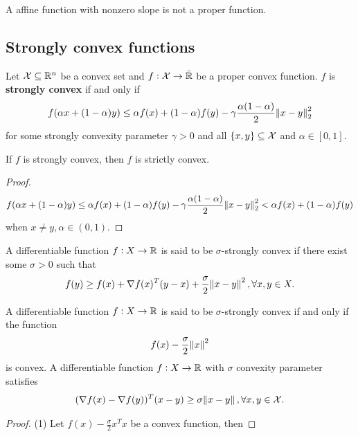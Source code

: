 \begin{refsection}
\begin{remark}
A affine function with nonzero slope is not a proper function.
\end{remark}

\subsection{Strongly convex functions}\label{ch:convex-analysis:sec:stronglyConvexFunctions}
\begin{definition}
Let $\mathcal{X} \subseteq \mathbb{R}^n$ be a convex set and $f:\mathcal{X} \to \bar{\mathbb{R}}$ be a proper convex function. $f$ is \textbf{strongly convex} if and only if
$$f(\alpha x + (1 - \alpha)y) \leq \alpha f(x) + (1 - \alpha)f(y) - \gamma \frac{\alpha(1-\alpha)}{2}\norm{x - y}_2^2$$
for some strongly convexity parameter $\gamma > 0$ and all $\{x,y\}\subseteq \mathcal{X}$ and $\alpha \in [0,1]$.
\end{definition}

\begin{lemma}
	If $f$ is strongly convex, then $f$ is strictly convex.
\end{lemma}
\begin{proof}
	$$f(\alpha x + (1 - \alpha)y) \leq \alpha f(x) + (1 - \alpha)f(y) - \gamma \frac{\alpha(1-\alpha)}{2}\norm{x - y}_2^2 < \alpha f(x) + (1 - \alpha)f(y)$$
when $x\neq y, \alpha \in (0,1).$
\end{proof}


\begin{definition}
	A differentiable function $f:X\to \mathbb{R}$ is said to be $\sigma$-strongly convex if there exist some $\sigma>0$ such that
	$$f(y) \geq f(x) + \nabla f(x)^T(y-x) + \frac{\sigma}{2}\norm{x-y}^2,\forall x,y \in X.$$
\end{definition}

\begin{lemma}
	A differentiable function $f:X\to \mathbb{R}$ is said to be $\sigma$-strongly convex if and only if the function $$f(x) - \frac{\sigma}{2}\norm{x}^2$$
	is convex. 
		A differentiable function $f:X\to \mathbb{R}$ with $\sigma$ convexity parameter satisfies 
	$$(\nabla f(x) - \nabla f(y))^T(x - y) \geq \sigma \norm{x - y}, \forall x,y \in \mathcal{X}.$$
\end{lemma}
\begin{proof}
(1)
Let $f(x) - \frac{\sigma}{2}x^Tx$ be a convex function, then


\end{proof}
\end{refsection}
